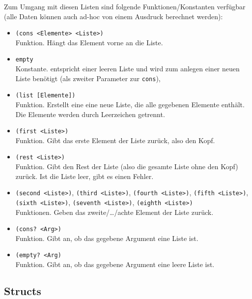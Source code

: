 	Zum Umgang mit diesen Listen sind folgende Funktionen/Konstanten verfügbar (alle Daten können auch ad-hoc von einem Ausdruck berechnet werden):
	\begin{itemize}
		\item \lstinline[language = Racket]|(cons <Elemente> <Liste>)| \\ Funktion. Hängt das Element vorne an die Liste.
		\item \lstinline[language = Racket]|empty| \\ Konstante. entspricht einer leeren Liste und wird zum anlegen einer neuen Liste benötigt (als zweiter Parameter zur \texttt{cons}),
		\item \lstinline[language = Racket]|(list [Elemente])| \\ Funktion. Erstellt eine eine neue Liste, die alle gegebenen Elemente enthält. Die Elemente werden durch Leerzeichen getrennt.
		\item \lstinline[language = Racket]|(first <Liste>)| \\ Funktion. Gibt das erste Element der Liste zurück, also den Kopf.
		\item \lstinline[language = Racket]|(rest <Liste>)| \\ Funktion. Gibt den Rest der Liste (also die gesamte Liste ohne den Kopf) zurück. Ist die Liste leer, gibt es einen Fehler.
		\item \lstinline[language = Racket]|(second <Liste>)|, \lstinline[language = Racket]|(third <Liste>)|, \lstinline[language = Racket]|(fourth <Liste>)|, \lstinline[language = Racket]|(fifth <Liste>)|, \lstinline[language = Racket]|(sixth <Liste>)|, \lstinline[language = Racket]|(seventh <Liste>)|, \lstinline[language = Racket]|(eighth <Liste>)| \\ Funktionen. Geben das zweite/\dots/achte Element der Liste zurück.
		\item \lstinline[language = Racket]|(cons? <Arg>)| \\ Funktion. Gibt an, ob das gegebene Argument eine Liste ist.
		\item \lstinline[language = Racket]|(empty? <Arg)| \\ Funktion. Gibt an, ob das gegebene Argument eine leere Liste ist.
	\end{itemize}

\subsection{Structs}
	\label{sec:racket_structs}

